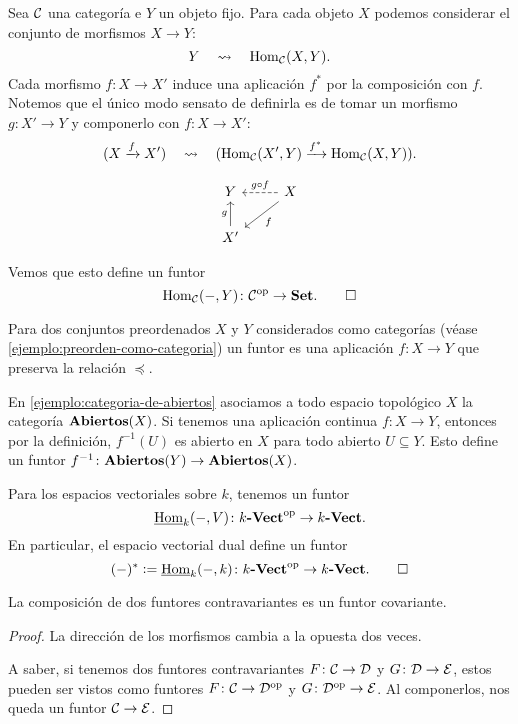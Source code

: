 \documentclass{article}
\numberwithin{equation}{section}
\theoremstyle{definition}
\begin{document}
\begin{ejemplo}
  \label{ejemplo:hom-contravariante}
  Sea $\mathcal{C}$ una categoría e $Y$ un objeto fijo. Para cada objeto $X$
  podemos considerar el conjunto de morfismos $X\to Y$:
  $$Y \quad\rightsquigarrow\quad \operatorname{Hom}_\mathcal{C} (X,Y).$$
  Cada morfismo $f\colon X\to X'$ induce una aplicación $f^*$ por la composición
  con $f$. Notemos que el único modo sensato de definirla es de tomar un
  morfismo $g\colon X' \to Y$ y componerlo con $f\colon X \to X'$:
  \[ (X\xrightarrow{f} X') \quad\rightsquigarrow\quad
     (\operatorname{Hom}_\mathcal{C} (X',Y) \xrightarrow{f^*} \operatorname{Hom}_\mathcal{C} (X,Y)). \]

  \[ \begin{tikzcd}
      Y & X\ar{dl}{f}\ar[dashed]{l}[swap]{g\circ f} \\
      X'\ar{u}{g}
    \end{tikzcd} \]

  Vemos que esto define un funtor
  \[ \operatorname{Hom}_\mathcal{C} (-,Y)\colon \mathcal{C}^\mathrm{op} \to
     \text{\bf Set}. \qedhere \]
\end{ejemplo}

\begin{ejemplo}
  Para dos conjuntos preordenados $X$ y $Y$ considerados como categorías (véase
  \ref{ejemplo:preorden-como-categoria}) un funtor es una aplicación
  $f\colon X\to Y$ que preserva la relación $\preceq$.
\end{ejemplo}

\begin{ejemplo}
  En \ref{ejemplo:categoria-de-abiertos} asociamos a todo espacio topológico $X$
  la categoría $\text{\bf Abiertos} (X)$. Si tenemos una aplicación continua
  $f\colon X\to Y$, entonces por la definición, $f^{-1} (U)$ es abierto en $X$
  para todo abierto $U\subseteq Y$. Esto define un funtor
  $f^{-1}\colon \text{\bf Abiertos} (Y)\to \text{\bf Abiertos} (X)$.
\end{ejemplo}

\begin{ejemplo}
  Para los espacios vectoriales sobre $k$, tenemos un funtor
  $$\underline{\operatorname{Hom}}_k (-, V)\colon k\text{\bf -Vect}^\mathrm{op} \to k\text{\bf -Vect}.$$
  En particular, el espacio vectorial dual define un funtor
  \[ (-)^* \mathrel{\mathop:}= \underline{\operatorname{Hom}}_k (-, k)\colon k\text{\bf -Vect}^\mathrm{op} \to
     k\text{\bf -Vect}. \qedhere \]
\end{ejemplo}

\begin{observacion}
  La composición de dos funtores contravariantes es un funtor covariante.

  \begin{proof}
    La dirección de los morfismos cambia a la opuesta dos veces.

    A saber, si tenemos dos funtores contravariantes
    $F\colon \mathcal{C}\to\mathcal{D}$ y $G\colon \mathcal{D}\to\mathcal{E}$, estos
    pueden ser vistos como funtores
    $F\colon \mathcal{C}\to\mathcal{D}^\mathrm{op}$ y
    $G\colon \mathcal{D}^\mathrm{op}\to\mathcal{E}$. Al componerlos, nos queda un
    funtor $\mathcal{C}\to\mathcal{E}$.
  \end{proof}
\end{observacion}
\end{document}
